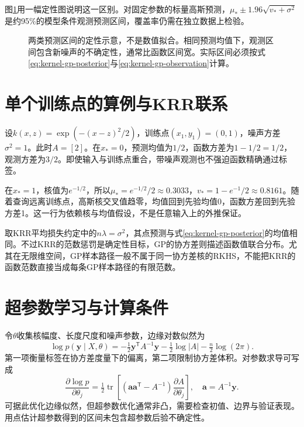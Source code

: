 图\ref{fig:kernel-gp-variance}用一幅定性图说明这一区别。对固定参数的标量高斯预测，$\mu_*\pm1.96\sqrt{v_*+\sigma^2}$是约95\%的模型条件观测预测区间，覆盖率仍需在独立数据上检验。
\begin{figure}[htbp]
\centering
{}
\caption{两类预测区间的定性示意，不是数值拟合。相同预测均值下，观测区间包含新噪声的不确定性，通常比函数区间宽。实际区间必须按式\eqref{eq:kernel-gp-posterior}与\eqref{eq:kernel-gp-observation}计算。}
\label{fig:kernel-gp-variance}
\end{figure}

\section{单个训练点的算例与KRR联系}
设$k(x,z)=\exp(-(x-z)^2/2)$，训练点$(x_1,y_1)=(0,1)$，噪声方差$\sigma^2=1$。此时$A=[2]$。在$x_*=0$，预测均值为$1/2$，函数方差为$1-1/2=1/2$，观测方差为$3/2$。即使输入与训练点重合，带噪声观测也不强迫函数精确通过标签。

在$x_*=1$，核值为$e^{-1/2}$，所以$\mu_*=e^{-1/2}/2\approx0.3033$，$v_*=1-e^{-1}/2\approx0.8161$。随着查询远离训练点，高斯核交叉值趋零，均值回到先验均值0，函数方差回到先验方差1。这一行为依赖核与均值假设，不是任意输入上的外推保证。

取KRR平均损失约定中的$n\lambda=\sigma^2$，其点预测与式\eqref{eq:kernel-gp-posterior}的均值相同。不过KRR的范数惩罚是确定性目标，GP的协方差则描述函数值联合分布。尤其在无限维空间，GP样本路径一般不属于同一协方差核的RKHS，不能把KRR的函数范数直接当成每条GP样本路径的有限范数。

\section{超参数学习与计算条件}
令$\theta$收集核幅度、长度尺度和噪声参数，边缘对数似然为
\begin{equation}
 \log p(\bm y\mid X,\theta)
 =-\tfrac12\bm y^{\mathsf T}A^{-1}\bm y
 -\tfrac12\log|A|-\tfrac n2\log(2\pi).
\end{equation}
第一项衡量标签在协方差度量下的偏离，第二项限制协方差体积。对参数求导可写成
\begin{equation}
 \frac{\partial\log p}{\partial\theta_j}
 =\tfrac12\operatorname{tr}\left[
 (\bm a\bm a^{\mathsf T}-A^{-1})\frac{\partial A}{\partial\theta_j}\right],
 \quad\bm a=A^{-1}\bm y.
\end{equation}
可据此优化边缘似然，但超参数优化通常非凸，需要检查初值、边界与验证表现。用点估计超参数得到的区间未包含超参数后验不确定性。

